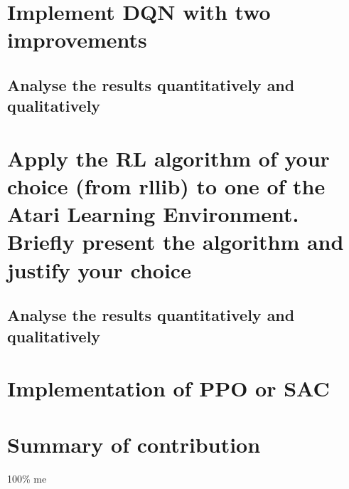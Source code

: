 \documentclass[a4pape, 11pt, english]{article}
\begin{document}
\section{Implement DQN with two improvements}

\subsection{Analyse the results quantitatively and qualitatively}

\section{Apply the RL algorithm of your choice (from rllib) to one of the Atari Learning Environment. Briefly present the algorithm and justify your choice}

\subsection{Analyse the results quantitatively and qualitatively}

\section{Implementation of PPO or SAC}

\section{Summary of contribution}
100\% me


\end{document}
